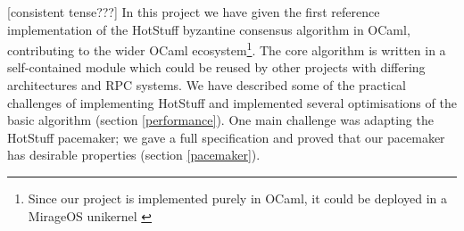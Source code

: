 




[consistent tense???]
In this project we have given the first reference implementation of the HotStuff byzantine consensus algorithm in OCaml, contributing to the wider OCaml ecosystem\footnote{Since our project is implemented purely in OCaml, it could be deployed in a MirageOS unikernel \cite{mirage}}. The core algorithm is written in a self-contained module which could be reused by other projects with differing architectures and RPC systems. We have described some of the practical challenges of implementing HotStuff and implemented several optimisations of the basic algorithm (section \ref{performance}). One main challenge was adapting the HotStuff pacemaker; we gave a full specification and proved that our pacemaker has desirable properties (section \ref{pacemaker}).

